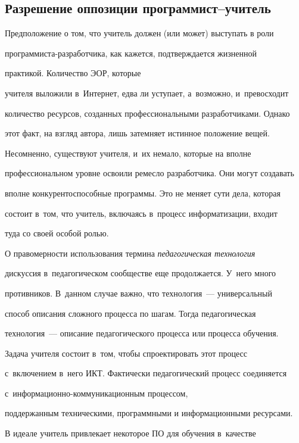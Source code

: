   \subsection{Разрешение оппозиции программист--учитель}



  Предположение о том, что учитель должен (или может) выступать в роли

про\-грам\-миста-раз\-ра\-бот\-чи\-ка, как кажется, подтверждается жизненной

практикой. Количество ЭОР, которые

учителя выложили в~Интернет, едва ли уступает, а~возможно, и~превосходит

количество ресурсов, созданных профессиональными разработчиками. Однако

этот факт, на взгляд автора, лишь затемняет истинное положение вещей.

Несомненно, существуют учителя, и~их немало, которые на вполне

профессиональном уровне освоили ремесло разработчика. Они могут создавать

вполне конкурентоспособные программы. Это не меняет сути дела, которая

состоит в~том, что учитель, включаясь в~процесс информатизации, входит

туда со своей особой ролью.



  О правомерности использования термина \textit{педагогическая технология}

дискуссия в~педагогическом сообществе еще продолжается. У~него много

противников. В~данном случае важно, что технология~--- универсальный

способ описания сложного процесса по шагам. Тогда педагогическая

технология~--- описание педагогического процесса или процесса обучения.

Задача учителя состоит в~том, чтобы спроектировать этот процесс

с~включением в~него ИКТ. Фактически педагогический процесс соединяется

с~ин\-фор\-ма\-ци\-он\-но-ком\-му\-ни\-ка\-ци\-он\-ным процессом,

поддержанным техническими, программными и информационными ресурсами.



  В идеале учитель привлекает некоторое ПО для обучения в~качестве

